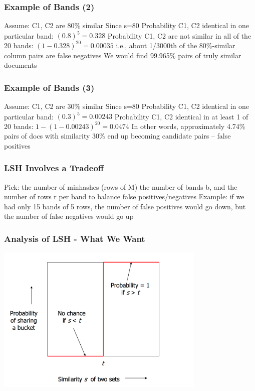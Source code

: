 \documentclass[svgnames]{beamer}
\begin{document}
  
\begin{frame} \frametitle{Example of Bands (2)}

Assume: C1, C2 are 80\% similar
Since s=80%
Probability C1, C2 identical in one particular band: $(0.8)^5 = 0.328$
Probability C1, C2 are not similar in all of the 20 bands: $(1-0.328)^{20} = 0.00035$
  i.e., about 1/3000th of the 80\%-similar column pairs are false negatives
  We would find 99.965\% pairs of truly similar documents
  
\end{frame}

  
\begin{frame} \frametitle{Example of Bands (3)}

Assume: C1, C2 are 30\% similar
Since s=80%
Probability C1, C2 identical in one particular band: $(0.3)^5 = 0.00243$
Probability C1, C2 identical in at least 1 of 20 bands: $1 - (1 - 0.00243)^{20} = 0.0474$
  In other words, approximately 4.74\% pairs of docs with similarity 30\% end up becoming candidate pairs -- false positives
  
\end{frame}

  
\begin{frame} \frametitle{LSH Involves a Tradeoff}

Pick:
  the number of minhashes (rows of M)
  the number of bands b, and
  the number of rows r per band
to balance false positives/negatives
Example: if we had only 15 bands of 5 rows, the number of false positives would go down, but the number of false negatives would go up

\end{frame}

  
\begin{frame} \frametitle{Analysis of LSH - What We Want}

\includegraphics[width=10cm]{what-we-want}

\end{frame}
\end{document}
